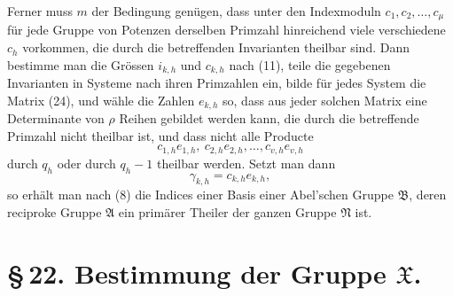 \documentclass[11pt]{article}
\providecommand{\grpA}{\mathfrak A}
\providecommand{\grpB}{\mathfrak B}
\providecommand{\grpN}{\mathfrak N}
\providecommand{\grpX}{\mathfrak X}
\begin{document}
Ferner muss $m$ der Bedingung genügen, dass unter den Indexmoduln $c_1,c_2,
\ldots,c_\mu$ für jede Gruppe von Potenzen derselben Primzahl hinreichend viele verschiedene $c_h$ vorkommen, die durch die betreffenden Invarianten theilbar sind. Dann bestimme man die Grössen $i_{k,h}$ und $c_{k,h}$ nach (11), teile die gegebenen Invarianten in Systeme nach ihren Primzahlen ein, bilde für jedes System die Matrix (24), und wähle die Zahlen $e_{k,h}$ so, dass aus jeder solchen Matrix eine Determinante von $\rho$ Reihen gebildet werden kann, die durch die betreffende Primzahl nicht theilbar ist, und dass nicht alle Producte
\[
 c_{1,h}e_{1,h},\ c_{2,h}e_{2,h},
\ldots,c_{v,h}e_{v,h}
\]
durch $q_h$ oder durch $q_h-1$ theilbar werden. Setzt man dann
\[
 \gamma_{k,h}=c_{k,h}e_{k,h},
\]
so erhält man nach (8) die Indices einer Basis einer Abel'schen Gruppe $\grpB$, deren reciproke Gruppe $\grpA$ ein primärer Theiler der ganzen Gruppe $\grpN$ ist.

\section*{\S\,22. Bestimmung der Gruppe $\grpX$.}
\end{document}
